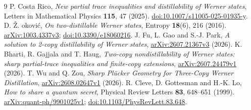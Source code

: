 \documentclass[11pt,a4paper]{article}
\begin{document}
\begin{thebibliography}{9}
P. Costa Rico, \emph{New partial trace inequalities and distillability of Werner states},
Letters in Mathematical Physics \textbf{115}, 47 (2025).
\href{https://doi.org/10.1007/s11005-025-01935-y}{doi:10.1007/s11005-025-01935-y}.
D. \v Z. \DJ okovi\'c, \emph{On two-distillable Werner states},
Entropy \textbf{18}(6), 216 (2016).
\href{https://arxiv.org/abs/1003.4337v3}{arXiv:1003.4337v3};
\href{https://doi.org/10.3390/e18060216}{doi:10.3390/e18060216}.
J. Fu, L. Gao and S.-J. Park, \emph{A solution to 2-copy distillability of Werner states},
\href{https://arxiv.org/abs/2607.21367v3}{arXiv:2607.21367v3} (2026).
K. Bharti, R. Gajjala and T. Haug,
\emph{Two-copy nondistillability of Werner states: sharp partial-trace inequalities and finite-copy extensions},
\href{https://arxiv.org/abs/2607.24479v1}{arXiv:2607.24479v1} (2026).
T. Wu and Q. Zou, \emph{Sharp Pl\"ucker Geometry for Three-Copy Werner Distillation},
\href{https://arxiv.org/abs/2608.02647v1}{arXiv:2608.02647v1} (2026).
R. Cleve, D. Gottesman and H.-K. Lo, \emph{How to share a quantum secret},
Physical Review Letters \textbf{83}, 648--651 (1999).
\href{https://arxiv.org/abs/quant-ph/9901025v1}{arXiv:quant-ph/9901025v1};
\href{https://doi.org/10.1103/PhysRevLett.83.648}{doi:10.1103/PhysRevLett.83.648}.
\end{thebibliography}
\end{document}
